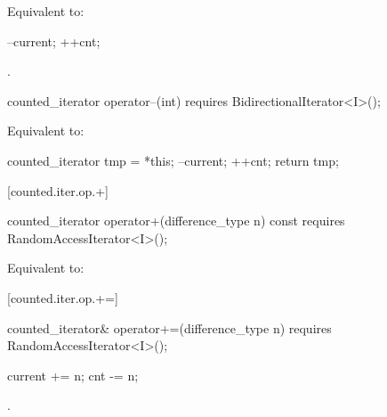 \begin{itemdescr}
\pnum
\effects Equivalent to:
\begin{codeblock}
--current;
++cnt;
\end{codeblock}

\pnum
\returns {}.
\end{itemdescr}

%
%
\begin{itemdecl}
  counted_iterator operator--(int)
    requires BidirectionalIterator<I>();
\end{itemdecl}

\begin{itemdescr}
\pnum
\effects Equivalent to:
\begin{codeblock}
counted_iterator tmp = *this;
--current;
++cnt;
return tmp;
\end{codeblock}
\end{itemdescr}

[counted.iter.op.+]{}

%
%
\begin{itemdecl}
  counted_iterator operator+(difference_type n) const
    requires RandomAccessIterator<I>();
\end{itemdecl}

\begin{itemdescr}
\pnum
\requires {}

\pnum
\effects Equivalent to:
\end{itemdescr}

[counted.iter.op.+=]{}

%
%
\begin{itemdecl}
  counted_iterator& operator+=(difference_type n)
    requires RandomAccessIterator<I>();
\end{itemdecl}

\begin{itemdescr}
\pnum
\requires {}

\pnum
\effects
\begin{codeblock}
current += n;
cnt -= n;
\end{codeblock}

\pnum
\returns {}.
\end{itemdescr}

